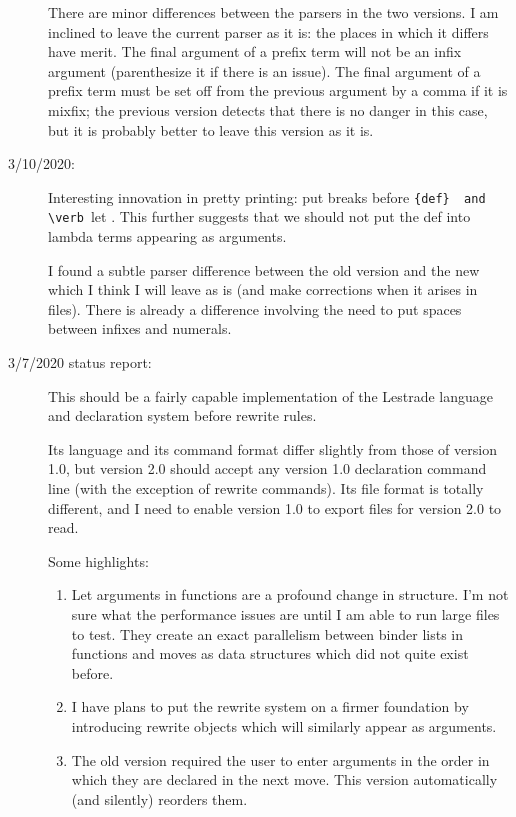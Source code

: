 \documentclass[12pt]{article}
\begin{document}
\begin{description}
There are minor differences between the parsers in the two versions.  I am inclined to leave the current parser as it is:  the places in which it differs have merit.  The final argument of a prefix term will not be an infix argument (parenthesize it if there is an issue).  The final argument of a prefix term must be set off
from the previous argument by a comma if it is mixfix;  the previous version detects that there is no danger in this case, but it is probably better to leave this version as it is.




\item[3/10/2020:] 

Interesting innovation in pretty printing:  put breaks before \verb ({def}  and \verb ({let} .  This further suggests that we should not put the def into lambda terms appearing as arguments.

I found a subtle parser difference between the old version and the new which I think I will leave as is
(and make corrections when it arises in files).  There is already a difference involving the need
to put spaces between infixes and numerals.



\item[3/7/2020 status report:]  This should be a fairly capable implementation of the
Lestrade language and declaration system before rewrite rules.

Its language and its command format differ slightly from those of version 1.0, but
version 2.0 should accept any version 1.0 declaration command line
(with the exception of rewrite commands).  Its file format is
totally different, and I need to enable version 1.0 to export files for version 2.0 to read.

Some highlights:

\begin{enumerate}

\item  Let arguments in functions are a profound change in structure.  I'm not sure what
the performance issues are until I am able to run large files to test.  They create an exact
parallelism between binder lists in functions and moves as data structures which did not quite exist before.

\item  I have plans to put the rewrite system on a firmer foundation by introducing rewrite objects
which will similarly appear as arguments.

\item  The old version required the user to enter arguments in the order in which they are declared in the next move.  This version automatically (and silently) reorders them.


\end{enumerate}
\end{description}
\end{document}

